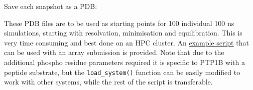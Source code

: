 Save each snapshot as a PDB:

\begin{Shaded}
\begin{Highlighting}[]
 
\OperatorTok{=}\OperatorTok{=}\OperatorTok{=} \OperatorTok{=}
\SpecialCharTok{\{}\SpecialCharTok{\}}\OperatorTok{+}\SpecialCharTok{\}}\NormalTok{)}
\end{Highlighting}
\end{Shaded}

These PDB files are to be used as starting points for 100 individual 100
ns simulations, starting with resolvation, minimisation and
equilibration. This is very time consuming and best done on an HPC
cluster. An \href{02_run_seededMD.py}{example script} that can be used
with an array submission is provided. Note that due to the additional
phospho residue parameters required it is specific to PTP1B with a
peptide substrate, but the \texttt{load\_system()} function can be
easily modified to work with other systems, while the rest of the script
is transferable.
